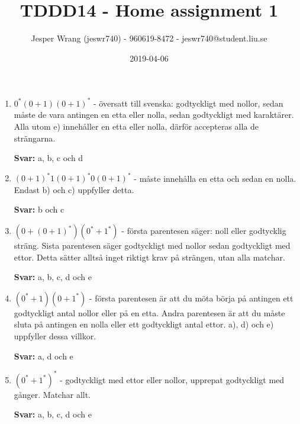 \documentclass{article}
\title{TDDD14 - Home assignment 1}
\author{Jesper Wrang (jeswr740) - 960619-8472 - jeswr740@student.liu.se}
\date{2019-04-06}
\begin{document}
\maketitle


\section{}

\begin{enumerate}[label=(\alph*)]
    \item $0^*(0+1)(0+1)^*$  - översatt till svenska: godtyckligt med nollor, sedan måste de vara antingen en etta eller nolla, sedan godtyckligt med karaktärer. Alla utom e) innehåller en etta eller nolla, därför accepteras alla de strängarna.

    \textbf{Svar:} a, b, c och d

    \item $(0+1)^*1(0+1)^*0(0+1)^*$ - måste innehålla en etta och sedan en nolla. Endast b) och c) uppfyller detta.

    \textbf{Svar:} b och c

    \item $(0 + (0 + 1)^*)(0^*+1^*)$ - första parentesen säger: noll eller godtycklig sträng. Sista parentesen säger godtyckligt med nollor sedan godtyckligt med ettor. Detta sätter alltså inget riktigt krav på strängen, utan alla matchar.

    \textbf{Svar:} a, b, c, d och e

    \item $(0^*+1)(0+1^*)$ - första parentesen är att du möta börja på antingen ett godtyckligt antal nollor eller på en etta. Andra parentesen är att du måste sluta på antingen en nolla eller ett godtyckligt antal ettor. a), d) och e) uppfyller dessa villkor.

    \textbf{Svar:} a, d och e

    \item $(0^*+1^*)^*$ - godtyckligt med ettor eller nollor, upprepat godtyckligt med gånger. Matchar allt. 

    \textbf{Svar:} a, b, c, d och e
\end{enumerate}


\end{document}

